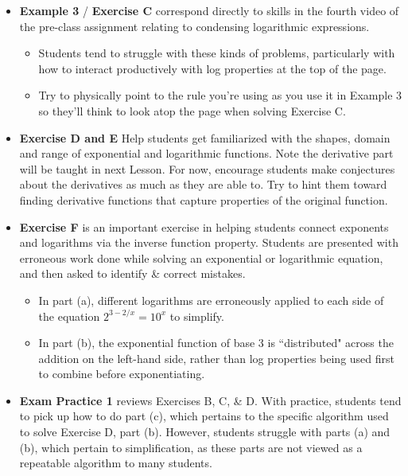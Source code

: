 \documentclass[10pt]{article}
\begin{document}
\begin{itemize}
\begin{itemize}
    \end{itemize}
\item {\bf\color{blue} Example 3} / {\bf\color{blue} Exercise C} correspond directly to skills in the fourth video of the pre-class assignment relating to condensing logarithmic expressions.
    \begin{itemize}
    \item Students tend to struggle with these kinds of problems, particularly with how to interact productively with log properties at the top of the page.
    \item Try to physically point to the rule you're using as you use it in Example 3 so they'll think to look atop the page when solving Exercise C.
    \end{itemize}
\item {\bf\color{blue} Exercise D and E} Help students get familiarized with the shapes, domain and range of exponential and logarithmic functions. Note the derivative part will be taught in next Lesson. For now, encourage students make conjectures about the derivatives as much as they are able to. Try to hint them toward finding derivative functions that capture properties of the original function.
\item {\bf\color{blue} Exercise F} is an important exercise in helping students connect exponents and logarithms via the inverse function property. Students are presented with erroneous work done while solving an exponential or logarithmic equation, and then asked to identify \& correct mistakes.
    \begin{itemize}
    \item In part (a), different logarithms are erroneously applied to each side of the equation $2^{3-2/x}=10^x$ to simplify.
    \item In part (b), the exponential function of base 3 is ``distributed" across the addition on the left-hand side, rather than log properties being used first to combine before exponentiating.
    \end{itemize}
\item {\bf\color{blue} Exam Practice 1} reviews Exercises B, C, \& D. With practice, students tend to pick up how to do part (c), which pertains to the specific algorithm used to solve Exercise D, part (b). However, students struggle with parts (a) and (b), which pertain to simplification, as these parts are not viewed as a repeatable algorithm to many students.

\end{itemize}
\end{document}
